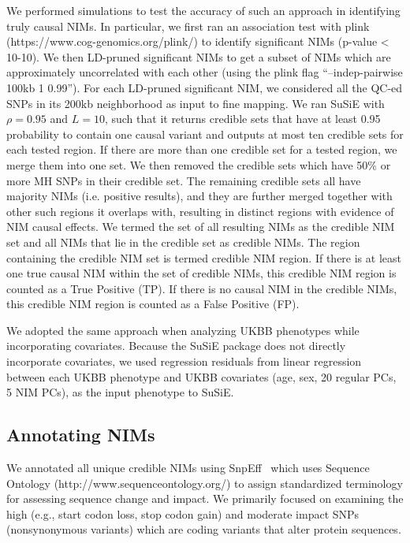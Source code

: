 We performed simulations to test the accuracy of such an approach in identifying truly causal NIMs. In particular, we first ran an association test with plink (https://www.cog-genomics.org/plink/) to identify significant NIMs (p-value < 10-10). We then LD-pruned significant NIMs to get a subset of NIMs which are approximately uncorrelated with each other (using the plink flag ``--indep-pairwise 100kb 1 0.99''). For each LD-pruned significant NIM, we considered all the QC-ed SNPs in its 200kb neighborhood as input to fine mapping. We ran SuSiE with $\rho = 0.95$ and $L = 10$, such that it returns credible sets that have at least 0.95 probability to contain one causal variant and outputs at most ten credible sets for each tested region. If there are more than one credible set for a tested region, we merge them into one set.     We then removed the credible sets which have 50\% or more MH SNPs in their credible set. The remaining credible sets all have majority NIMs (i.e. positive results), and they are further merged together with other such regions it overlaps with, resulting in distinct regions with evidence of NIM causal effects. We termed the set of all resulting NIMs as the credible NIM set and all NIMs that lie in the credible set as credible NIMs. The region containing the credible NIM set is termed credible NIM region. If there is at least one true causal NIM within the set of credible NIMs, this credible NIM region is counted as a True Positive (TP). If there is no causal NIM in the credible NIMs, this credible NIM region is counted as a False Positive (FP). 
 
We adopted the same approach when analyzing UKBB phenotypes while incorporating covariates. Because the SuSiE package does not directly incorporate covariates, we used regression residuals from linear regression between each UKBB phenotype and UKBB covariates (age, sex, 20 regular PCs, 5 NIM PCs), as the input phenotype to SuSiE.   

\subsection{Annotating NIMs}
\label{sec:annot}
We annotated all unique credible NIMs using SnpEff~\cite{cingolani2012program} which uses Sequence Ontology (http://www.sequenceontology.org/) to assign standardized terminology for assessing sequence change and impact. We primarily focused on examining the high (e.g., start codon loss, stop codon gain) and moderate impact SNPs (nonsynonymous variants) which are coding variants that alter protein sequences.

